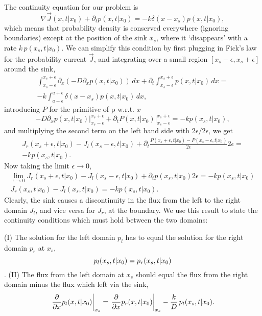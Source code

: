 The continuity equation for our problem is
\begin{equation}
 \nabla \vec{J}(x,t|x_0) + \partial_t p(x,t|x_0) = -k \delta( x - x_s ) p(x,t|x_0),
\end{equation}
which means that probability density is conserved everywhere (ignoring boundaries) except at the position of the sink $x_s$, where it `disappears' with a rate $k\,p(x_s,t|x_0)$. We can simplify this condition by first plugging in Fick's law for the probability current $\vec{J}$, and integrating over a small region $[x_s - \epsilon,x_s + \epsilon]$ around the sink, 
\setlength{\jot}{10pt}
\begin{gather}
\int_{x_s - \epsilon}^{x_s + \epsilon} \partial_x \left( -D \partial_x p(x,t|x_0)  \right) \, dx + \partial_t \int_{x_s - \epsilon}^{x_s + \epsilon} p(x,t|x_0) \, dx = \nonumber \\
-k \int_{a - \epsilon}^{a + \epsilon} \delta( x - x_s ) p(x,t|x_0) \, dx, \nonumber
\end{gather}
introducing $P$ for the primitive of p w.r.t. $x$
\begin{equation}
\left. -D \partial_x p(x,t|x_0)  \right|_{x_s - \epsilon}^{x_s + \epsilon} + \partial_t \left. P(x,t|x_0) \right|_{x_s - \epsilon}^{x_s + \epsilon} = -k p(x_s,t|x_0) \nonumber,
\end{equation}
and multiplying the second term on the left hand side with $2\epsilon/2\epsilon$, we get
\begin{gather}
J_r(x_s + \epsilon,t|x_0) - J_l(x_s - \epsilon,t|x_0) + \partial_t \frac{P(x_s + \epsilon,t|x_0) - P(x_s - \epsilon,t|x_0)}{2 \epsilon} 2\epsilon = \nonumber \\ 
-k p(x_s,t|x_0). \nonumber
\end{gather}
Now taking the limit $\epsilon \rightarrow 0$,
\begin{gather}
 \lim_{\epsilon \to 0} J_r(x_s + \epsilon,t|x_0) - J_l(x_s - \epsilon,t|x_0) + \partial_t p(x_s,t|x_0) 2\epsilon = -k p(x_s,t|x_0) \nonumber \\
 J_r(x_s,t|x_0) - J_l(x_s,t|x_0) = -k p(x_s,t|x_0).
\end{gather}
Clearly, the sink causes a discontinuity in the flux from the left to the right domain $J_l$, and vice versa for $J_r$, at the boundary. We use this result to state the continuity conditions which must hold between the two domains:
\newline

(I) The solution for the left domain $p_l$ has to equal the solution for the right domain $p_r$ at $x_s$,
\begin{equation} 
 p_l(x_s,t|x_0) = p_r(x_s,t|x_0) 
 \elabel{Cont_I}
\end{equation}.
(II) The flux from the left domain at $x_s$ should equal the flux from the right domain minus the flux which left via the sink,
\begin{equation} 
 \left. \pdiff{}{x} p_l(x,t|x_0) \right|_{x_s} = \left. \pdiff{}{x} p_r(x,t|x_0) \right|_{x_s} - \frac{k}{D} \, p_{l}(x_s,t|x_0).
 \elabel{Cont_II}
\end{equation}

